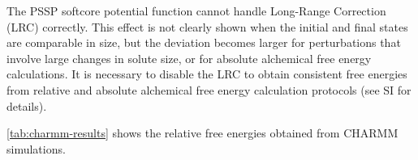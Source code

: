 \documentclass[journal=jctcce,manuscript=article]{achemso}
\providecommand{\DIFadd}[1]{\protect\cbstart{\protect\color{blue}\uwave{#1}}\protect\cbend} %
\providecommand{\DIFdel}[1]{\protect\cbdelete{\protect\color{red}\sout{#1}}\protect\cbdelete} %
\providecommand{\DIFaddbegin}{} %
\providecommand{\DIFaddend}{} %
\providecommand{\DIFdelbegin}{} %
\providecommand{\DIFdelend}{} %
\newcommand{\DIFscaledelfig}{0.5}
\newlength{\DIFdelgraphicswidth} %
\newlength{\DIFdelgraphicsheight} %
\newcommand{\DIFaddincludegraphics}[2][]{{\color{blue}\fbox{\DIFOincludegraphics[#1]{#2}}}} %
\newcommand{\DIFdelincludegraphics}[2][]{%
\sbox{\DIFdelgraphicsbox}{\DIFOincludegraphics[#1]{#2}}%
\settoboxwidth{\DIFdelgraphicswidth}{\DIFdelgraphicsbox} %
\settoboxtotalheight{\DIFdelgraphicsheight}{\DIFdelgraphicsbox} %
\scalebox{\DIFscaledelfig}{%
\parbox[b]{\DIFdelgraphicswidth}{\usebox{\DIFdelgraphicsbox}\\[-\baselineskip] \rule{\DIFdelgraphicswidth}{0em}}\llap{\resizebox{\DIFdelgraphicswidth}{\DIFdelgraphicsheight}{%
\setlength{\unitlength}{\DIFdelgraphicswidth}%
\begin{picture}(1,1)%
\thicklines\linethickness{2pt} %
{\color[rgb]{1,0,0}\put(0,0){\framebox(1,1){}}}%
{\color[rgb]{1,0,0}\put(0,0){\line( 1,1){1}}}%
{\color[rgb]{1,0,0}\put(0,1){\line(1,-1){1}}}%
\end{picture}%
}\hspace*{3pt}}} %
} %
\DeclareRobustCommand{\DIFaddbegin}{\DIFOaddbegin \let\includegraphics\DIFaddincludegraphics} %
\DeclareRobustCommand{\DIFaddend}{\DIFOaddend \let\includegraphics\DIFOincludegraphics} %
\DeclareRobustCommand{\DIFdelbegin}{\DIFOdelbegin \let\includegraphics\DIFdelincludegraphics} %
\DeclareRobustCommand{\DIFdelend}{\DIFOaddend \let\includegraphics\DIFOincludegraphics} %
\begin{document}

The PSSP softcore potential function cannot handle Long-Range Correction (LRC) correctly. This effect is not clearly shown when the initial and final states are comparable in size, but the deviation becomes larger for perturbations that involve large changes in solute size, or for absolute alchemical free energy calculations. It is necessary to disable the LRC to obtain consistent free energies from relative and absolute alchemical free energy calculation protocols (see SI for details).

\DIFdelbegin \DIFdel{Table }\DIFdelend \DIFaddbegin \DIFadd{Tab. }\DIFaddend \ref{tab:charmm-results} shows the relative free energies obtained from CHARMM simulations.
\end{document}
